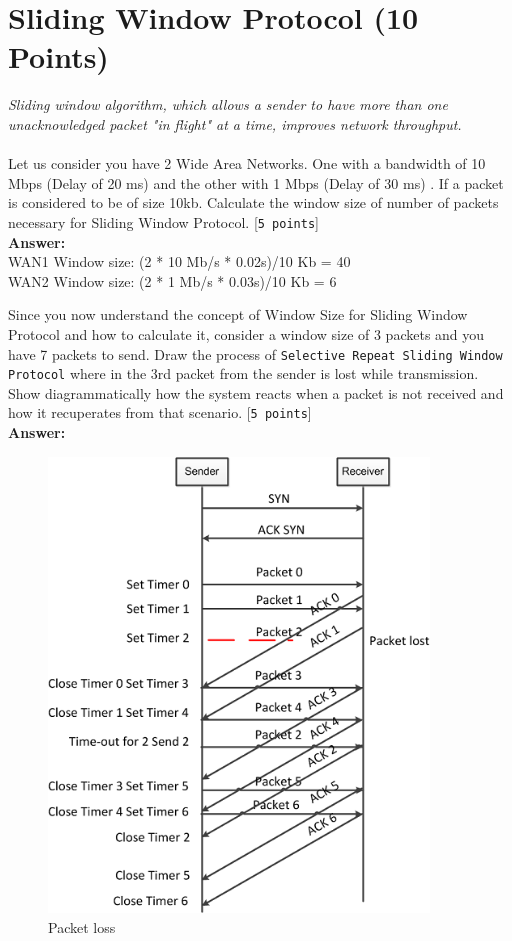 \documentclass{WeSTassignment}
\begin{document}
\section{Sliding Window Protocol (10 Points)}
\emph{Sliding window algorithm, which allows a sender to have more than one unacknowledged packet "in flight" at a time, improves network throughput. }\\ \\
Let us consider you have 2 Wide Area Networks. One with a bandwidth of 10 Mbps (Delay of 20 ms) and the other with 1 Mbps (Delay of 30 ms) . If a packet is considered to be of size 10kb. Calculate the window size of number of packets necessary for Sliding Window Protocol. [\texttt{5 points}]\\
\textbf{Answer:} \\
WAN1 Window size: (2 * 10 Mb/s * 0.02s)/10 Kb = 40 \\
WAN2 Window size: (2 * 1 Mb/s * 0.03s)/10 Kb = 6 


Since you now understand the concept of Window Size for Sliding Window Protocol and how to calculate it, consider a window size of 3 packets and you have 7 packets to send. Draw the process of \texttt{Selective Repeat Sliding Window Protocol} where in the 3rd packet from the sender is lost while transmission. Show diagrammatically how the system reacts when a packet is not received and how it recuperates from that scenario. [\texttt{5 points}]\\ 
\textbf{Answer:} \\
\begin{figure}[ht]
	\centering
	\includegraphics[width=0.9\textwidth]{tango_assigment2_3_2.png}
	\caption{Packet loss}
	\label{fig:packet_loss}
\end{figure}
\end{document}

